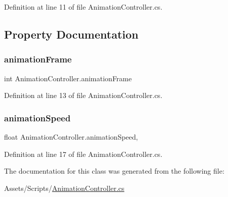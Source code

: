 Definition at line 11 of file Animation\+Controller.\+cs.



\subsection{Property Documentation}
\mbox{\label{class_animation_controller_a97a1baad1d6f5f5e48145cad30ec8d16}} 
\subsubsection{\texorpdfstring{animationFrame}{animationFrame}}
{\footnotesize\ttfamily int Animation\+Controller.\+animation\+Frame\hspace{0.3cm}{\ttfamily [get]}}



Definition at line 13 of file Animation\+Controller.\+cs.

\mbox{\label{class_animation_controller_a9a5d475137de1a9cb890396d404104a4}} 
\subsubsection{\texorpdfstring{animationSpeed}{animationSpeed}}
{\footnotesize\ttfamily float Animation\+Controller.\+animation\+Speed\hspace{0.3cm}{\ttfamily [get]}, {\ttfamily [set]}}



Definition at line 17 of file Animation\+Controller.\+cs.



The documentation for this class was generated from the following file\+:\begin{DoxyCompactItemize}
\item 
Assets/\+Scripts/\mbox{\hyperlink{_animation_controller_8cs}{Animation\+Controller.\+cs}}\end{DoxyCompactItemize}
